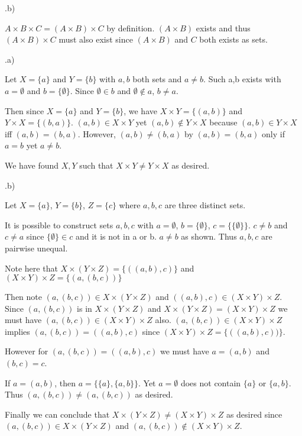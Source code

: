 \documentclass{article}
\begin{document}
.b)
\medskip

$A \times B \times C = (A \times B) \times C$ by definition. $(A \times B)$ exists and thus $(A \times B) \times C$ must also exist since $(A \times B)$ and $C$ both exists as sets.

.a)

Let $X = \{a\}$ and $Y = \{b\}$ with $a,b$ both sets and $a \neq b$. Such a,b exists with $a = \emptyset$ and $b = \{\emptyset\}$. Since $\emptyset \in b$ and $\emptyset \notin a$, $b \neq a$.

\medskip
Then since $X = \{a\}$ and $Y = \{b\}$, we have $X \times Y = \{(a,b)\}$ and $Y \times X = \{(b,a)\}$. $(a,b) \in X \times Y$ yet $(a,b) \notin Y \times X$ because $(a,b) \in Y \times X$ iff $(a,b) = (b,a)$. However, $(a,b) \neq (b,a)$ by $(a,b) = (b,a)$ only if $a = b$ yet $a \neq b$.

\medskip
We have found $X,Y$ such that $X \times Y \neq Y \times X$ as desired.

.b)

Let $X = \{a\}$, $Y = \{b\}$, $Z = \{c\}$ where $a,b,c$ are three distinct sets. 

\medskip
It is possible to construct sets $a,b,c$ with $a = \emptyset$, $b = \{\emptyset\}$, $c = \{\{\emptyset\}\}$. $c \neq b$ and $c \neq a$ since $\{\emptyset\} \in c$ and it is not in a or b. $a \neq b$ as shown. Thus $a,b,c$ are pairwise unequal.

\medskip
Note here that $X \times (Y \times Z) = \{((a,b),c)\}$ and $(X \times Y) \times Z = \{(a,(b,c))\}$

\medskip
Then note $(a,(b,c)) \in X \times (Y \times Z)$ and $((a,b),c) \in (X \times Y) \times Z$. Since $(a,(b,c))$ is in $X \times (Y \times Z)$ and $X \times (Y \times Z) = (X \times Y) \times Z$ we must have $(a,(b,c)) \in (X \times Y) \times Z$ also. $(a,(b,c)) \in (X \times Y) \times Z$ implies $(a,(b,c)) = ((a,b),c)$ since $(X \times Y) \times Z = \{((a,b),c))\}$.

\medskip
However for $(a,(b,c)) = ((a,b),c)$ we must have $a = (a,b)$ and $(b,c) = c$. 

\medskip
If $a = (a,b)$, then $a = \{\{a\},\{a,b\}\}$. Yet $a = \emptyset$ does not contain $\{a\}$ or $\{a,b\}$. Thus $(a,(b,c)) \neq (a,(b,c))$ as desired.

\medskip
Finally we can conclude that $X \times (Y \times Z) \neq (X \times Y) \times Z$ as desired since $(a,(b,c)) \in X \times (Y \times Z)$ and $(a,(b,c)) \notin (X \times Y) \times Z$.
\end{document}
